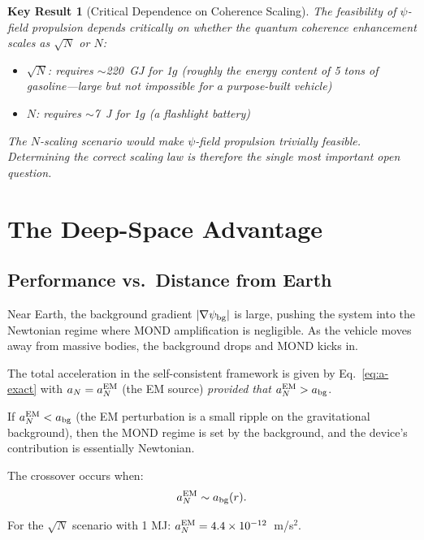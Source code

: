 \documentclass[aps,prd,twocolumn,superscriptaddress,nofootinbib]{revtex4-2}
\newcommand{\ee}[1]{\times 10^{#1}}
\newtheorem{result}{Key Result}
\begin{document}
\begin{result}[Critical Dependence on Coherence Scaling]
The feasibility of $\psi$-field propulsion depends critically on whether
the quantum coherence enhancement scales as $\sqrt{N}$ or $N$:
\begin{itemize}[nosep]
\item $\sqrt{N}$: requires $\sim$220~GJ for 1$g$ (roughly the energy
content of 5 tons of gasoline---large but not impossible for a
purpose-built vehicle)
\item $N$: requires $\sim$7~J for 1$g$ (a flashlight battery)
\end{itemize}
The $N$-scaling scenario would make $\psi$-field propulsion trivially
feasible.  Determining the correct scaling law is therefore the
single most important open question.
\end{result}


\section{The Deep-Space Advantage}\label{sec:deep-space}

\subsection{Performance vs.\ Distance from Earth}

Near Earth, the background gradient $|\nabla\psi_{\rm bg}|$ is large,
pushing the system into the Newtonian regime where MOND amplification
is negligible.  As the vehicle moves away from massive bodies, the
background drops and MOND kicks in.

The total acceleration in the self-consistent framework is given by
Eq.~\eqref{eq:a-exact} with $a_N = a_N^{\rm EM}$ (the EM source)
\emph{provided that} $a_N^{\rm EM} > a_{\rm bg}$.

If $a_N^{\rm EM} < a_{\rm bg}$ (the EM perturbation is a small ripple
on the gravitational background), then the MOND regime is set by the
background, and the device's contribution is essentially Newtonian.

The crossover occurs when:
\begin{equation}
a_N^{\rm EM} \sim a_{\rm bg}(r).
\end{equation}

For the $\sqrt{N}$ scenario with 1 MJ:
$a_N^{\rm EM} = 4.4\ee{-12}$~m/s$^2$.
\end{document}
